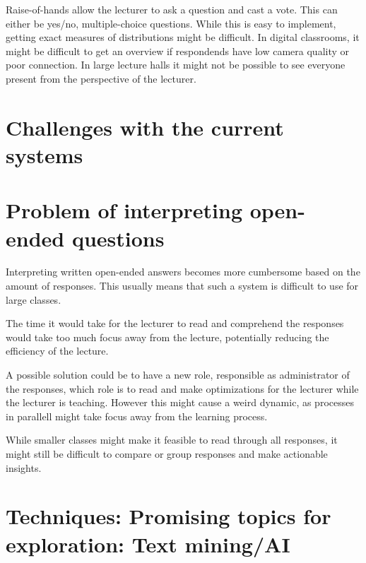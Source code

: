 Raise-of-hands allow the lecturer to ask a question and cast a vote. This can either be yes/no, multiple-choice questions. While this is easy to implement, getting exact measures of distributions might be difficult. In digital classrooms, it might be difficult to get an overview if respondends have low camera quality or poor connection. In large lecture halls it might not be possible to see everyone present from the perspective of the lecturer. 

\section{Challenges with the current systems}

\section{Problem of interpreting open-ended questions}
Interpreting written open-ended answers becomes more cumbersome based on the amount of responses. This usually means that such a system is difficult to use for large classes. 

The time it would take for the lecturer to read and comprehend the responses would take too much focus away from the lecture, potentially reducing the efficiency of the lecture. 

A possible solution could be to have a new role, responsible as administrator of the responses, which role is to read and make optimizations for the lecturer while the lecturer is teaching. However this might cause a weird dynamic, as processes in parallell might take focus away from the learning process.

While smaller classes might make it feasible to read through all responses, it might still be difficult to compare or group responses and make actionable insights. 

\section{Techniques: Promising topics for exploration: Text mining/AI}

